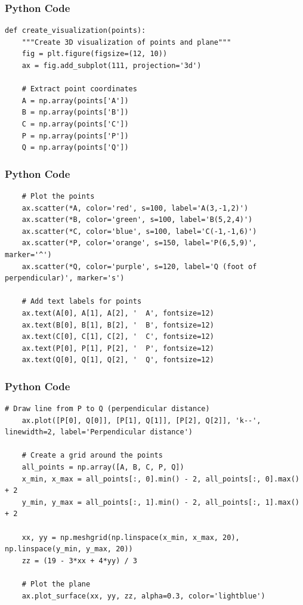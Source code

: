 \documentclass{beamer}
\begin{document}
\begin{frame}[fragile]
    \frametitle{Python Code}
    \begin{lstlisting}
def create_visualization(points):
    """Create 3D visualization of points and plane"""
    fig = plt.figure(figsize=(12, 10))
    ax = fig.add_subplot(111, projection='3d')

    # Extract point coordinates
    A = np.array(points['A'])
    B = np.array(points['B'])
    C = np.array(points['C'])
    P = np.array(points['P'])
    Q = np.array(points['Q'])
    \end{lstlisting}
\end{frame}

\begin{frame}[fragile]
    \frametitle{Python Code}
    \begin{lstlisting}
    # Plot the points
    ax.scatter(*A, color='red', s=100, label='A(3,-1,2)')
    ax.scatter(*B, color='green', s=100, label='B(5,2,4)')
    ax.scatter(*C, color='blue', s=100, label='C(-1,-1,6)')
    ax.scatter(*P, color='orange', s=150, label='P(6,5,9)', marker='^')
    ax.scatter(*Q, color='purple', s=120, label='Q (foot of perpendicular)', marker='s')

    # Add text labels for points
    ax.text(A[0], A[1], A[2], '  A', fontsize=12)
    ax.text(B[0], B[1], B[2], '  B', fontsize=12)
    ax.text(C[0], C[1], C[2], '  C', fontsize=12)
    ax.text(P[0], P[1], P[2], '  P', fontsize=12)
    ax.text(Q[0], Q[1], Q[2], '  Q', fontsize=12)
    \end{lstlisting}
\end{frame}

\begin{frame}[fragile]
    \frametitle{Python Code}
    \begin{lstlisting}
# Draw line from P to Q (perpendicular distance)
    ax.plot([P[0], Q[0]], [P[1], Q[1]], [P[2], Q[2]], 'k--', linewidth=2, label='Perpendicular distance')
    
    # Create a grid around the points
    all_points = np.array([A, B, C, P, Q])
    x_min, x_max = all_points[:, 0].min() - 2, all_points[:, 0].max() + 2
    y_min, y_max = all_points[:, 1].min() - 2, all_points[:, 1].max() + 2

    xx, yy = np.meshgrid(np.linspace(x_min, x_max, 20), np.linspace(y_min, y_max, 20))
    zz = (19 - 3*xx + 4*yy) / 3

    # Plot the plane
    ax.plot_surface(xx, yy, zz, alpha=0.3, color='lightblue')
    \end{lstlisting}
\end{frame}
\end{document}
